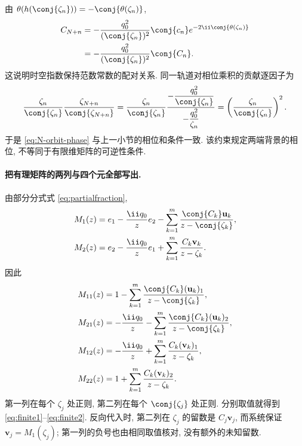 由 $\theta(h(\conj{\zeta_n}))=-\conj{\theta(\zeta_n)}$,
\[
\begin{aligned}
C_{N+n}
&=-\dfrac{q_0^2}{(\conj{\zeta_n})^2}\conj{c_n}
e^{-2\ii\conj{\theta(\zeta_n)}}\\
&=-\dfrac{q_0^2}{(\conj{\zeta_n})^2}\conj{C_n}.
\end{aligned}
\]
这说明时空指数保持范数常数的配对关系.
同一轨道对相位乘积的贡献逐因子为
\[
\dfrac{\zeta_n}{\conj{\zeta_n}}
\dfrac{\zeta_{N+n}}{\conj{\zeta_{N+n}}}
=\dfrac{\zeta_n}{\conj{\zeta_n}}
\dfrac{-\dfrac{q_0^2}{\conj{\zeta_n}}}{-\dfrac{q_0^2}{\zeta_n}}
=\left(\dfrac{\zeta_n}{\conj{\zeta_n}}\right)^2.
\]
于是 \eqref{eq:N-orbit-phase} 与上一小节的相位和条件一致.
该约束规定两端背景的相位, 不等同于有限维矩阵的可逆性条件.

\paragraph{把有理矩阵的两列与四个元全部写出.}
由部分分式式 \eqref{eq:partialfraction},
\[
\begin{aligned}
M_1(z)&=e_1-\dfrac{\ii q_0}{z}e_2
-\sum\limits_{k=1}^{m}\dfrac{\conj{C_k}\mathbf u_k}{z-\conj{\zeta_k}},\\
M_2(z)&=e_2-\dfrac{\ii q_0}{z}e_1
+\sum\limits_{k=1}^{m}\dfrac{C_k\mathbf v_k}{z-\zeta_k}.
\end{aligned}
\]
因此
\[
\begin{aligned}
M_{11}(z)&=1-\sum\limits_{k=1}^{m}
\dfrac{\conj{C_k}(\mathbf u_k)_1}{z-\conj{\zeta_k}},\\
M_{21}(z)&=-\dfrac{\ii q_0}{z}-\sum\limits_{k=1}^{m}
\dfrac{\conj{C_k}(\mathbf u_k)_2}{z-\conj{\zeta_k}},\\
M_{12}(z)&=-\dfrac{\ii q_0}{z}+\sum\limits_{k=1}^{m}
\dfrac{C_k(\mathbf v_k)_1}{z-\zeta_k},\\
M_{22}(z)&=1+\sum\limits_{k=1}^{m}
\dfrac{C_k(\mathbf v_k)_2}{z-\zeta_k}.
\end{aligned}
\]
第一列在每个 $\zeta_j$ 处正则, 第二列在每个 $\conj{\zeta_j}$ 处正则.
分别取值就得到 \eqref{eq:finite1}--\eqref{eq:finite2}.
反向代入时, 第二列在 $\zeta_j$ 的留数是 $C_j\mathbf v_j$,
而系统保证 $\mathbf v_j=M_1(\zeta_j)$;
第一列的负号也由相同取值核对, 没有额外的未知留数.

